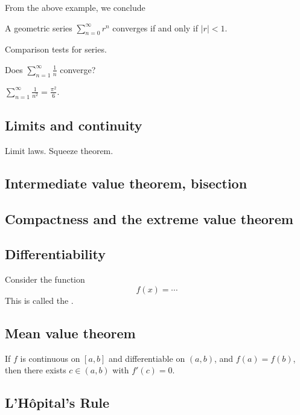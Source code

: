 From the above example, we conclude
\begin{theorem}
A geometric series $\sum_{n=0}^\infty r^n$ converges if and only if $|r| < 1$.
\end{theorem}

Comparison tests for series.

\begin{example}
Does $\displaystyle \sum_{n=1}^\infty \frac{1}{n}$ converge?
\end{example}

\begin{example}
$\displaystyle \sum_{n=1}^\infty \frac{1}{n^2} = \frac{\pi^2}{6}$.
\end{example}

\subsection{Limits and continuity}

Limit laws. Squeeze theorem.

\subsection{Intermediate value theorem, bisection}
\subsection{Compactness and the extreme value theorem}

\subsection{Differentiability}

\begin{example}
Consider the function
\[ f(x) = \cdots \]
This is called the .
\end{example}

\subsection{Mean value theorem}

\begin{theorem}[Rolle]
If $f$ is continuous on $[a,b]$ and differentiable on $(a,b)$, and $f(a)=f(b)$, then there exists $c \in (a,b)$ with $f'(c) = 0$.
\end{theorem}

\subsection{L'H\^opital's Rule}
